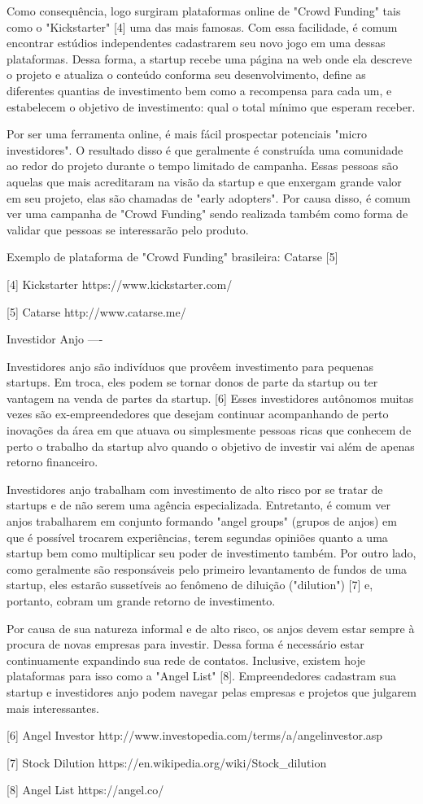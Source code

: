 Como consequência, logo surgiram plataformas online de "Crowd Funding" tais como o "Kickstarter" [4] uma das mais famosas. Com essa facilidade, é comum encontrar estúdios independentes cadastrarem seu novo jogo em uma dessas plataformas. Dessa forma, a startup recebe uma página na web onde ela descreve o projeto e atualiza o conteúdo conforma seu desenvolvimento, define as diferentes quantias de investimento bem como a recompensa para cada um, e estabelecem o objetivo de investimento: qual o total mínimo que esperam receber.

Por ser uma ferramenta online, é mais fácil prospectar potenciais "micro investidores". O resultado disso é que geralmente é construída uma comunidade ao redor do projeto durante o tempo limitado de campanha. Essas pessoas são aquelas que mais acreditaram na visão da startup e que enxergam grande valor em seu projeto, elas são chamadas de "early adopters". Por causa disso, é comum ver uma campanha de "Crowd Funding" sendo realizada também como forma de validar que pessoas se interessarão pelo produto.

Exemplo de plataforma de "Crowd Funding" brasileira: Catarse [5]

[4] Kickstarter
https://www.kickstarter.com/

[5] Catarse
http://www.catarse.me/


Investidor Anjo
----

Investidores anjo são indivíduos que provêem investimento para pequenas startups. Em troca, eles podem se tornar donos de parte da startup ou ter vantagem na venda de partes da startup. [6] Esses investidores autônomos muitas vezes são ex-empreendedores que desejam continuar acompanhando de perto inovações da área em que atuava ou simplesmente pessoas ricas que conhecem de perto o trabalho da startup alvo quando o objetivo de investir vai além de apenas retorno financeiro.

Investidores anjo trabalham com investimento de alto risco por se tratar de startups e de não serem uma agência especializada. Entretanto, é comum ver anjos trabalharem em conjunto formando "angel groups" (grupos de anjos) em que é possível trocarem experiências, terem segundas opiniões quanto a uma startup bem como multiplicar seu poder de investimento também. Por outro lado, como geralmente são responsáveis pelo primeiro levantamento de fundos de uma startup, eles estarão sussetíveis ao fenômeno de diluição ("dilution") [7] e, portanto, cobram um grande retorno de investimento.

Por causa de sua natureza informal e de alto risco, os anjos devem estar sempre à procura de novas empresas para investir. Dessa forma é necessário estar continuamente expandindo sua rede de contatos. Inclusive, existem hoje plataformas para isso como a "Angel List" [8]. Empreendedores cadastram sua startup e investidores anjo podem navegar pelas empresas e projetos que julgarem mais interessantes.


[6] Angel Investor
http://www.investopedia.com/terms/a/angelinvestor.asp

[7] Stock Dilution
https://en.wikipedia.org/wiki/Stock_dilution

[8] Angel List
https://angel.co/
